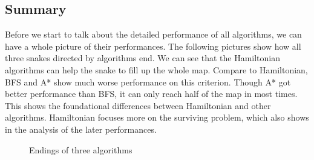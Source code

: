 \documentclass[12pt]{article}
\begin{document}
\subsection{Summary}

Before we start to talk about the detailed performance of all algorithms, we can have a whole picture of their performances. The following pictures show how all three snakes directed by algorithms end. We can see that the Hamiltonian algorithms can help the snake to fill up the whole map. Compare to Hamiltonian, BFS and A* show much worse performance on this criterion. Though A* got better performance than BFS, it can only reach half of the map in most times. This shows the foundational differences between Hamiltonian and other algorithms. Hamiltonian focuses more on the surviving problem, which also shows in the analysis of the later performances.

\begin{figure}[H]
    \centering

        \caption{Endings of three algorithms}
\end{figure}
\end{document}
